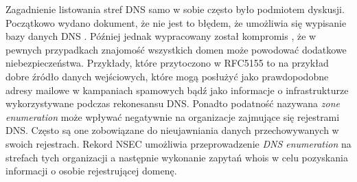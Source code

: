 Zagadnienie listowania stref DNS samo w sobie często było podmiotem dyskusji. Początkowo wydano dokument, że nie jest to błędem,
że umożliwia się wypisanie bazy danych DNS \cite{RFC4033}. Później jednak wypracowany został kompromis \cite{RFC5155}, że w pewnych
przypadkach znajomość wszystkich domen może powodować dodatkowe niebezpieczeństwa. Przykłady, które przytoczono w RFC5155 \cite{RFC5155}
to na przykład dobre źródło danych wejściowych, które mogą posłużyć jako prawdopodobne adresy mailowe w kampaniach spamowych bądź
jako informacje o infrastrukturze wykorzystywane podczas rekonesansu DNS. Ponadto podatność nazywana \textit{zone enumeration}
może wpływać negatywnie na organizacje zajmujące się rejestrami DNS. Często są one zobowiązane do nieujawniania danych przechowywanych w
swoich rejestrach. Rekord NSEC umożliwia przeprowadzenie \textit{DNS enumeration} na strefach tych organizacji a następnie wykonanie
zapytań whois \cite{RFC3912} w celu pozyskania informacji o osobie rejestrującej domenę.
